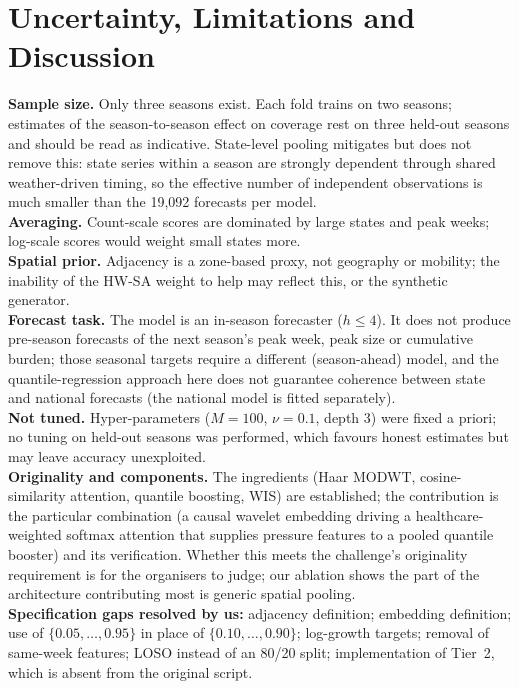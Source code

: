 \documentclass[11pt,a4paper]{article}
\begin{document}
\section{Uncertainty, Limitations and Discussion}\label{sec:limits}
\textbf{Sample size.} Only three seasons exist. Each fold trains on two seasons; estimates of the season-to-season effect on coverage rest on three held-out seasons and should be read as indicative. State-level pooling mitigates but does not remove this: state series within a season are strongly dependent through shared weather-driven timing, so the effective number of independent observations is much smaller than the 19{,}092 forecasts per model.\\
\textbf{Averaging.} Count-scale scores are dominated by large states and peak weeks; log-scale scores would weight small states more.\\
\textbf{Spatial prior.} Adjacency is a zone-based proxy, not geography or mobility; the inability of the HW-SA weight to help may reflect this, or the synthetic generator.\\
\textbf{Forecast task.} The model is an in-season forecaster ($h\le4$). It does not produce pre-season forecasts of the next season's peak week, peak size or cumulative burden; those seasonal targets require a different (season-ahead) model, and the quantile-regression approach here does not guarantee coherence between state and national forecasts (the national model is fitted separately).\\
\textbf{Not tuned.} Hyper-parameters ($M=100$, $\nu=0.1$, depth 3) were fixed a priori; no tuning on held-out seasons was performed, which favours honest estimates but may leave accuracy unexploited.\\
\textbf{Originality and components.} The ingredients (Haar MODWT, cosine-similarity attention, quantile boosting, WIS) are established; the contribution is the particular combination (a causal wavelet embedding driving a healthcare-weighted softmax attention that supplies pressure features to a pooled quantile booster) and its verification. Whether this meets the challenge's originality requirement is for the organisers to judge; our ablation shows the part of the architecture contributing most is generic spatial pooling.\\
\textbf{Specification gaps resolved by us:} adjacency definition; embedding definition; use of $\{0.05,\dots,0.95\}$ in place of $\{0.10,\dots,0.90\}$; log-growth targets; removal of same-week features; LOSO instead of an 80/20 split; implementation of Tier~2, which is absent from the original script.
\end{document}
